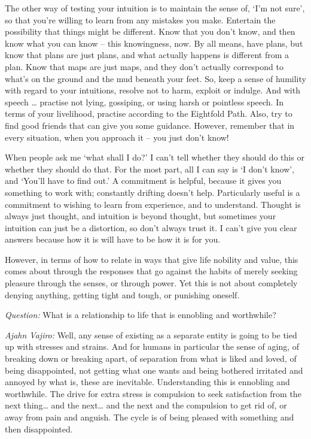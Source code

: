 The other way of testing your intuition is to maintain the sense of, `I'm not
sure', so that you're willing to learn from any mistakes you make. Entertain
the possibility that things might be different. Know that you don't know, and
then know what you can know -- this knowingness, now. By all means, have plans,
but know that plans are just plans, and what actually happens is different from
a plan. Know that maps are just maps, and they don't actually correspond to
what's on the ground and the mud beneath your feet. So, keep a sense of humility
with regard to your intuitions, resolve not to harm, exploit or indulge. And with speech \ldots{} practise not lying, gossiping, or using harsh or pointless
speech. In terms of your livelihood, practise according to the Eightfold Path.
Also, try to find good friends that can give you some guidance. However,
remember that in every situation, when you approach it -- you just don't know!

When people ask me `what shall I do?' I can't tell whether they should do this or whether they
should do that. For the most part, all I can say is `I don't know', and `You'll
have to find out.' A commitment is helpful, because it gives you something to
work with; constantly drifting doesn't help. Particularly useful is a commitment
to wishing to learn from experience, and to understand. Thought is always just
thought, and intuition is beyond thought, but sometimes your intuition can just
be a distortion, so don't always trust it. I can't give you clear answers
because how it is will have to be how it is for you.

However, in terms of how to relate in ways that give life nobility and value,
this comes about through the responses that go against the habits of merely seeking
pleasure through the senses, or through power. Yet this is not about completely
denying anything, getting tight and tough, or punishing oneself.

\bigskip

\emph{Question:} What is a relationship to life that is ennobling and worthwhile?

\emph{Ajahn Vajiro:} Well, any sense of existing as a separate entity is going to be
tied up with stresses and strains. And for humans in particular the sense of aging, of breaking down or breaking apart,
 of separation from what is liked and loved, of being disappointed, not getting what one wants and being bothered irritated and annoyed by what is, these are inevitable. Understanding this is ennobling and worthwhile.
The drive for extra stress is compulsion to seek satisfaction from the next thing… and the next… and the next and the compulsion to get rid of, or away from pain and anguish. The cycle is of being pleased with something and then disappointed. 

